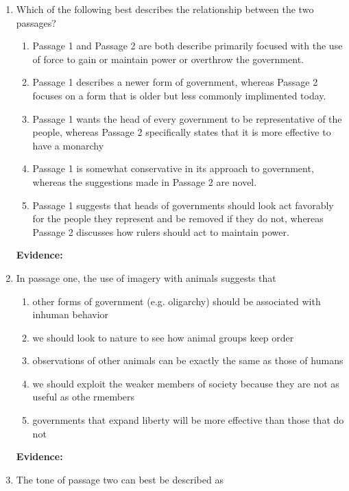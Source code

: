 \bigskip
\begin{enumerate}

\item Which of the following best describes the relationship between the two passages?

\bigskip
\begin{enumerate}[label=(\Alph*)]
\item Passage 1 and Passage 2 are both describe primarily focused with the use of force to gain or maintain power or overthrow the government. 
\item Passage 1 describes a newer form of government, whereas Passage 2 focuses on a form that is older but less commonly implimented today. 
\item Passage 1 wants the head of every government to be representative of the people, whereas Passage 2 specifically states that it is more effective to have a monarchy
\item Passage 1 is somewhat conservative in its approach to government, whereas the suggestions made in Passage 2 are novel. 
\item Passage 1 suggests that heads of governments should look act favorably for the people they represent and be removed if they do not, whereas Passage 2 discusses how rulers should act to maintain power. 
\end{enumerate}

\bigskip
\textbf{Evidence:} \hrulefill

\bigskip
\item In passage one, the use of imagery with animals suggests that 

\bigskip
\begin{enumerate}[label=(\Alph*)]
\item other forms of government (e.g. oligarchy) should be associated with inhuman behavior
\item we should look to nature to see how animal groups keep order
\item observations of other animals can be exactly the same as those of humans
\item we should exploit the weaker members of society because they are not as useful as othe rmembers
\item governments that expand liberty will be more effective than those that do not
\end{enumerate}

\bigskip
\textbf{Evidence:} \hrulefill

\bigskip
\item The tone of passage two can best be described as


\end{enumerate}
